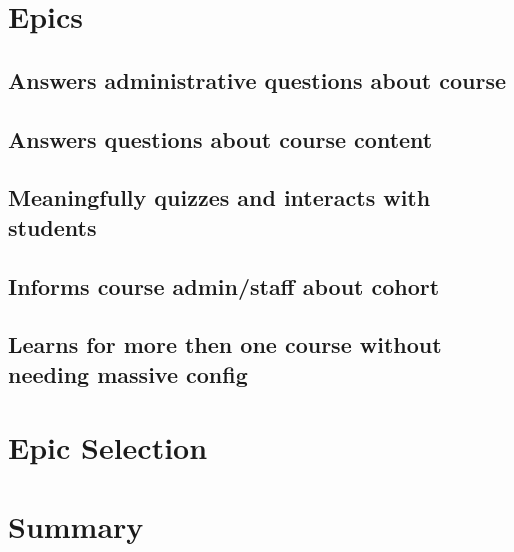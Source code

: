 \documentclass{article}
\begin{document}
\section{Epics}
\subsection{Answers administrative questions about course}


\subsection{Answers questions about course content}


\subsection{Meaningfully quizzes and interacts with students}


\subsection{Informs course admin/staff about cohort}


\subsection{Learns for more then one course without needing massive config}


\section{Epic Selection}


\section{Summary}
\end{document}
